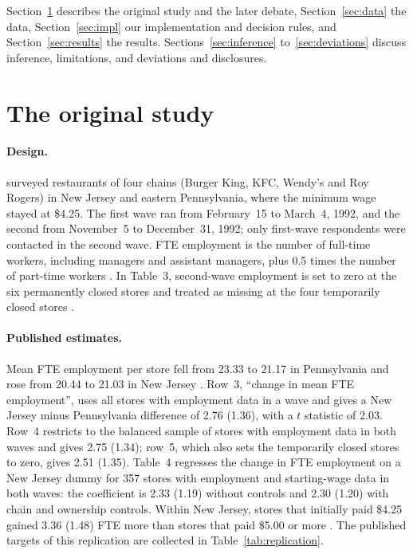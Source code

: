 \documentclass[11pt]{article}
\begin{document}
Section~\ref{sec:original} describes the original study and the later debate,
Section~\ref{sec:data} the data, Section~\ref{sec:impl} our implementation and decision
rules, and Section~\ref{sec:results} the results. Sections~\ref{sec:inference}
to~\ref{sec:deviations} discuss inference, limitations, and deviations and disclosures.

\section{The original study}
\label{sec:original}

\paragraph{Design.} \citet{card1994minimum} surveyed restaurants of four chains (Burger
King, KFC, Wendy's and Roy Rogers) in New Jersey and eastern Pennsylvania, where the
minimum wage stayed at \$4.25. The first wave ran from February~15 to March~4, 1992, and the
second from November~5 to December~31, 1992; only first-wave respondents were contacted in
the second wave. FTE employment is the number of full-time workers, including managers and
assistant managers, plus 0.5 times the number of part-time workers
\citep[p.~775 and Table~5 notes]{card1994minimum}. In Table~3, second-wave employment is
set to zero at the six permanently closed stores and treated as missing at the four
temporarily closed stores \citep{card1994minimum}.

\paragraph{Published estimates.} Mean FTE employment per store fell from 23.33 to 21.17 in
Pennsylvania and rose from 20.44 to 21.03 in New Jersey \citep[Table~3, rows~1--2]{card1994minimum}.
Row~3, ``change in mean FTE employment'', uses all stores with employment data in a wave and
gives a New Jersey minus Pennsylvania difference of 2.76 (1.36), with a $t$ statistic of
2.03. Row~4 restricts to the balanced sample of stores with employment data in both waves
and gives 2.75 (1.34); row~5, which also sets the temporarily closed stores to zero, gives
2.51 (1.35). Table~4 regresses the change in FTE employment on a New Jersey dummy for 357
stores with employment and starting-wage data in both waves: the coefficient is 2.33 (1.19)
without controls and 2.30 (1.20) with chain and ownership controls. Within New Jersey,
stores that initially paid \$4.25 gained 3.36 (1.48) FTE more than stores that paid
\$5.00 or more \citep[Table~3]{card1994minimum}. The published targets of this replication
are collected in Table~\ref{tab:replication}.
\end{document}
